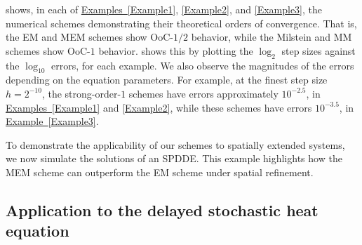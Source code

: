 \documentclass[onefignum]{siamart250211}
\begin{document}
 shows, in each of \hyperref[Example1]{Examples~\ref*{Example1}}, \ref{Example2}, and \ref{Example3}, the numerical schemes demonstrating their theoretical orders of convergence. That is, the EM and MEM schemes show OoC-$1/2$ behavior, while the Milstein and MM schemes show OoC-$1$ behavior.  shows this by plotting the $\log_2$ step sizes against the $\log_{10}$ errors, for each example. We also observe the magnitudes of the errors depending on the equation parameters. For example, at the finest step size $h=2^{-10}$, the strong-order-$1$ schemes have errors approximately $10^{-2.5}$, in \hyperref[Example1]{Examples~\ref*{Example1}} and \ref{Example2}, while these schemes have errors $10^{-3.5}$, in \hyperref[Example3]{Example~\ref*{Example3}}.

To demonstrate the applicability of our schemes to spatially extended systems, we now simulate the solutions of an SPDDE. This example highlights how the MEM scheme can outperform the EM scheme under spatial refinement.

\subsection{Application to the delayed stochastic heat equation}
\end{document}
